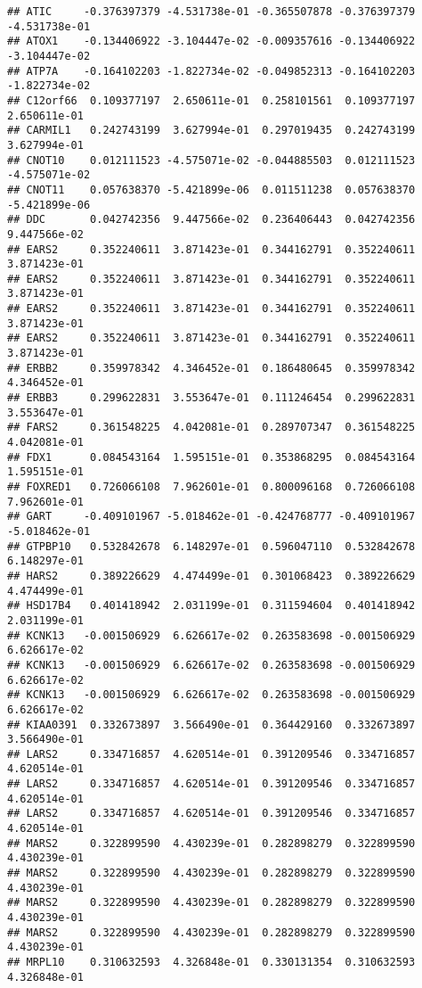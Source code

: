 \documentclass[
]{article}
\begin{document}
\begin{verbatim}
## ATIC     -0.376397379 -4.531738e-01 -0.365507878 -0.376397379 -4.531738e-01
## ATOX1    -0.134406922 -3.104447e-02 -0.009357616 -0.134406922 -3.104447e-02
## ATP7A    -0.164102203 -1.822734e-02 -0.049852313 -0.164102203 -1.822734e-02
## C12orf66  0.109377197  2.650611e-01  0.258101561  0.109377197  2.650611e-01
## CARMIL1   0.242743199  3.627994e-01  0.297019435  0.242743199  3.627994e-01
## CNOT10    0.012111523 -4.575071e-02 -0.044885503  0.012111523 -4.575071e-02
## CNOT11    0.057638370 -5.421899e-06  0.011511238  0.057638370 -5.421899e-06
## DDC       0.042742356  9.447566e-02  0.236406443  0.042742356  9.447566e-02
## EARS2     0.352240611  3.871423e-01  0.344162791  0.352240611  3.871423e-01
## EARS2     0.352240611  3.871423e-01  0.344162791  0.352240611  3.871423e-01
## EARS2     0.352240611  3.871423e-01  0.344162791  0.352240611  3.871423e-01
## EARS2     0.352240611  3.871423e-01  0.344162791  0.352240611  3.871423e-01
## ERBB2     0.359978342  4.346452e-01  0.186480645  0.359978342  4.346452e-01
## ERBB3     0.299622831  3.553647e-01  0.111246454  0.299622831  3.553647e-01
## FARS2     0.361548225  4.042081e-01  0.289707347  0.361548225  4.042081e-01
## FDX1      0.084543164  1.595151e-01  0.353868295  0.084543164  1.595151e-01
## FOXRED1   0.726066108  7.962601e-01  0.800096168  0.726066108  7.962601e-01
## GART     -0.409101967 -5.018462e-01 -0.424768777 -0.409101967 -5.018462e-01
## GTPBP10   0.532842678  6.148297e-01  0.596047110  0.532842678  6.148297e-01
## HARS2     0.389226629  4.474499e-01  0.301068423  0.389226629  4.474499e-01
## HSD17B4   0.401418942  2.031199e-01  0.311594604  0.401418942  2.031199e-01
## KCNK13   -0.001506929  6.626617e-02  0.263583698 -0.001506929  6.626617e-02
## KCNK13   -0.001506929  6.626617e-02  0.263583698 -0.001506929  6.626617e-02
## KCNK13   -0.001506929  6.626617e-02  0.263583698 -0.001506929  6.626617e-02
## KIAA0391  0.332673897  3.566490e-01  0.364429160  0.332673897  3.566490e-01
## LARS2     0.334716857  4.620514e-01  0.391209546  0.334716857  4.620514e-01
## LARS2     0.334716857  4.620514e-01  0.391209546  0.334716857  4.620514e-01
## LARS2     0.334716857  4.620514e-01  0.391209546  0.334716857  4.620514e-01
## MARS2     0.322899590  4.430239e-01  0.282898279  0.322899590  4.430239e-01
## MARS2     0.322899590  4.430239e-01  0.282898279  0.322899590  4.430239e-01
## MARS2     0.322899590  4.430239e-01  0.282898279  0.322899590  4.430239e-01
## MARS2     0.322899590  4.430239e-01  0.282898279  0.322899590  4.430239e-01
## MRPL10    0.310632593  4.326848e-01  0.330131354  0.310632593  4.326848e-01

\end{verbatim}
\end{document}
